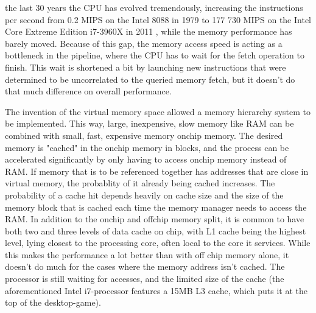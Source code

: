  the last 30 years the CPU has evolved tremendously, increasing the instructions per second from 0.2 MIPS on the Intel 8088 in 1979\cite{reference:intel} to 177 730 MIPS on the Intel Core Extreme Edition i7-3960X in 2011 \cite{reference:inteli7}, while the memory performance has barely moved. Because of this gap, the memory access speed is acting as a bottleneck in the pipeline, where the CPU has to wait for the fetch operation to finish. This wait is shortened a bit by launching new instructions that were determined to be uncorrelated to the queried memory fetch, but it doesn't do that much difference on overall performance.

The invention of the virtual memory space allowed a memory hierarchy system to be implemented. This way, large, inexpensive, slow memory like RAM can be combined with small, fast, expensive memory onchip memory. The desired memory is "cached" in the onchip memory in blocks, and the process can be accelerated significantly by only having to access onchip memory instead of RAM. If memory that is to be referenced together has addresses that are close in virtual memory, the probablity of it already being cached increases. The probability of a cache hit depends heavily on cache size and the size of the memory block that is cached each time the memory manager needs to access the RAM. In addition to the onchip and offchip memory split, it is common to have both two and three levels of data cache on chip, with L1 cache being the highest level, lying closest to the processing core, often local to the core it services. While this makes the performance a lot better than with off chip memory alone, it doesn't do much for the cases where the memory address isn't cached. The processor is still waiting for accesses, and the limited size of the cache (the aforementioned Intel i7-processor features a 15MB L3 cache, which puts it at the top of the desktop-game). 

